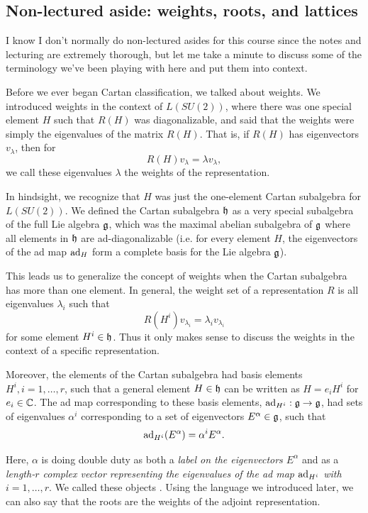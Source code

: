 \subsection*{Non-lectured aside: weights, roots, and lattices} I know I don't normally do non-lectured asides for this course since the notes and lecturing are extremely thorough, but let me take a minute to discuss some of the terminology we've been playing with here and put them into context.

Before we ever began Cartan classification, we talked about weights. We introduced weights in the context of $L(SU(2))$, where there was one special element $H$ such that $R(H)$ was diagonalizable, and said that the weights were simply the eigenvalues of the matrix $R(H)$. That is, if $R(H)$ has eigenvectors $v_\lambda$, then for
$$R(H)v_\lambda =\lambda v_\lambda,$$
we call these eigenvalues $\lambda$ the weights of the representation.

In hindsight, we recognize that $H$ was just the one-element Cartan subalgebra for $L(SU(2)).$ We defined the Cartan subalgebra $\mathfrak{h}$ as a very special subalgebra of the full Lie algebra $\mathfrak{g}$, which was the maximal abelian subalgebra of $\mathfrak{g}$ where all elements in $\mathfrak{h}$ are ad-diagonalizable (i.e. for every element $H$, the eigenvectors of the ad map $\operatorname{ad}_H$ form a complete basis for the Lie algebra $\mathfrak{g}$).

This leads us to generalize the concept of weights when the Cartan subalgebra has more than one element. In general, the weight set of a representation $R$ is all eigenvalues $\lambda_i$ such that
$$R(H^i)v_{\lambda_i}=\lambda_i v_{\lambda_i}$$ for some element $H^i\in \mathfrak{h}$. Thus it only makes sense to discuss the weights in the context of a specific representation.

Moreover, the elements of the Cartan subalgebra had basis elements $H^i, i=1,\ldots,r$, such that a general element $H\in \mathfrak{h}$ can be written as $H=e_i H^i$ for $e_i\in \mathbb{C}$. The ad map corresponding to these basis elements, $\operatorname{ad}_{H^i}: \mathfrak{g}\to \mathfrak{g}$, had sets of eigenvalues $\alpha^i$ corresponding to a set of eigenvectors $E^\alpha \in \mathfrak{g}$, such that
$$\operatorname{ad}_{H^i}(E^\alpha)=\alpha^i E^\alpha.$$ 

Here, $\alpha$ is doing double duty as both a \emph{label on the eigenvectors $E^\alpha$} and as a \emph{length-$r$ complex vector representing the eigenvalues of the ad map $\operatorname{ad}_{H^i}$ with $i=1,\ldots,r$}. We called these objects . Using the language we introduced later, we can also say that the roots are the weights of the adjoint representation. 

